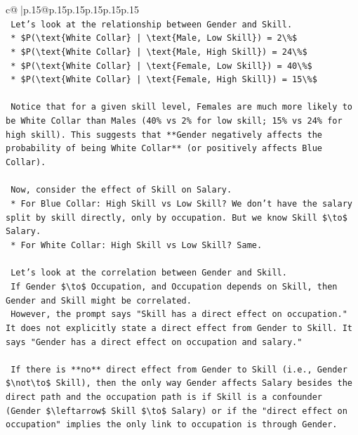\documentclass{article}
\begin{document}
{\begin{supertabular}{c@{$\;$}|p{.15\linewidth}@{}p{.15\linewidth}p{.15\linewidth}p{.15\linewidth}p{.15\linewidth}p{.15\linewidth}}
{{{\\ 
\texttt{    Let's look at the relationship between Gender and Skill.} \\
\texttt{    *   \$P(\textbackslash{}text\{White Collar\} | \textbackslash{}text\{Male, Low Skill\}) = 2\textbackslash{}\%\$} \\
\texttt{    *   \$P(\textbackslash{}text\{White Collar\} | \textbackslash{}text\{Male, High Skill\}) = 24\textbackslash{}\%\$} \\
\texttt{    *   \$P(\textbackslash{}text\{White Collar\} | \textbackslash{}text\{Female, Low Skill\}) = 40\textbackslash{}\%\$} \\
\texttt{    *   \$P(\textbackslash{}text\{White Collar\} | \textbackslash{}text\{Female, High Skill\}) = 15\textbackslash{}\%\$} \\
\\ 
\texttt{    Notice that for a given skill level, Females are much more likely to be White Collar than Males (40\% vs 2\% for low skill; 15\% vs 24\% for high skill). This suggests that **Gender negatively affects the probability of being White Collar** (or positively affects Blue Collar).} \\
\\ 
\texttt{    Now, consider the effect of Skill on Salary.} \\
\texttt{    *   For Blue Collar: High Skill vs Low Skill? We don't have the salary split by skill directly, only by occupation. But we know Skill \$\textbackslash{}to\$ Salary.} \\
\texttt{    *   For White Collar: High Skill vs Low Skill? Same.} \\
\\ 
\texttt{    Let's look at the correlation between Gender and Skill.} \\
\texttt{    If Gender \$\textbackslash{}to\$ Occupation, and Occupation depends on Skill, then Gender and Skill might be correlated.} \\
\texttt{    However, the prompt says "Skill has a direct effect on occupation." It does not explicitly state a direct effect from Gender to Skill. It says "Gender has a direct effect on occupation and salary."} \\
\\ 
\texttt{    If there is **no** direct effect from Gender to Skill (i.e., Gender \$\textbackslash{}not\textbackslash{}to\$ Skill), then the only way Gender affects Salary besides the direct path and the occupation path is if Skill is a confounder (Gender \$\textbackslash{}leftarrow\$ Skill \$\textbackslash{}to\$ Salary) or if the "direct effect on occupation" implies the only link to occupation is through Gender.} \\
}}}
\end{supertabular}}
\end{document}
